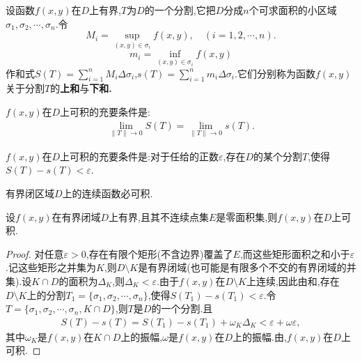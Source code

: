 \documentclass[../../main.tex]{subfiles}%
\begin{document}
\begin{definition}
设函数$f(x,y)$在$D$上有界,$T$为$D$的一个分割,它把$D$分成$n$个可求面积的小区域$\sigma_1,\sigma_2,\cdots,\sigma_n$.令
\[
M_i = \sup\limits_{(x,y) \in \sigma_i} f(x,y), \quad (i = 1,2,\cdots,n).
\]
\[
m_i = \inf\limits_{(x,y) \in \sigma_i} f(x,y)
\]
作和式$S(T) = \sum_{i=1}^n M_i \Delta \sigma_i$,$s(T) = \sum_{i=1}^n m_i \Delta \sigma_i$.它们分别称为函数$f(x,y)$关于分割$T$的\textbf{上和}与\textbf{下和.}
\end{definition}

\begin{theorem}\label{theorem:数分--定理21.4}
$f(x,y)$在$D$上可积的充要条件是:
\begin{align*}
\lim_{\| T \| \to 0} S(T) = \lim_{\| T \| \to 0} s(T).
\end{align*}
\end{theorem}

\begin{theorem}\label{theorem:数分--定理21.5}
$f(x,y)$在$D$上可积的充要条件是:对于任给的正数$\varepsilon$,存在$D$的某个分割$T$,使得$S(T) - s(T) < \varepsilon$.
\end{theorem}

\begin{theorem}\label{theorem:数分--定理21.6}
有界闭区域$D$上的连续函数必可积.
\end{theorem}

\begin{theorem}
设$f(x,y)$在有界闭域$D$上有界,且其不连续点集$E$是零面积集,则$f(x,y)$在$D$上可积.
\end{theorem}
\begin{proof}

对任意$\varepsilon > 0$,存在有限个矩形(不含边界)覆盖了$E$,而这些矩形面积之和小于$\varepsilon$.记这些矩形之并集为$K$,则$D \setminus K$是有界闭域(也可能是有限多个不交的有界闭域的并集).设$K \cap D$的面积为$\Delta_K$,则$\Delta_K < \varepsilon$.由于$f(x,y)$在$D \setminus K$上连续,因此由和,存在$D \setminus K$上的分割$T_1 = \{ \sigma_1,\sigma_2,\cdots,\sigma_n \}$,使得$S(T_1) - s(T_1) < \varepsilon$.令$T = \{ \sigma_1,\sigma_2,\cdots,\sigma_n,K \cap D \}$,则$T$是$D$的一个分割.且
\begin{align*}
S(T) - s(T) = S(T_1) - s(T_1) + \omega_K \Delta_K < \varepsilon + \omega \varepsilon,
\end{align*}
其中$\omega_K$是$f(x,y)$在$K \cap D$上的振幅,$\omega$是$f(x,y)$在$D$上的振幅.由,$f(x,y)$在$D$上可积.

\end{proof}
\end{document}
